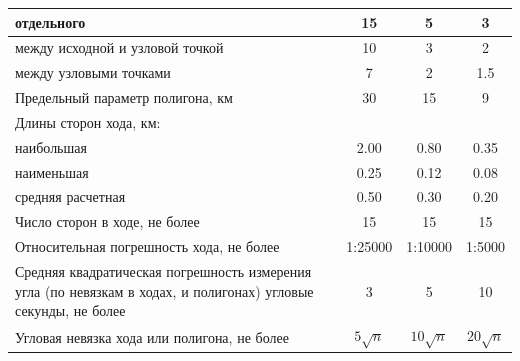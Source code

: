 \documentclass[a4paper]{article}
\begin{document}
\begin{newpage}
{\begin{center}
{\begin{tabular}{|p{280pt}|c|c|c|}
                    \hline
                    отдельного & 15 & 5 & 3\\
                    \hline
                    между исходной и узловой точкой & 10 & 3 & 2\\
                    \hline
                    между узловыми точками & 7 & 2 & 1.5\\
                    \hline
                    Предельный параметр полигона, км & 30 & 15 & 9\\
                    \hline
                    Длины сторон хода, км: &  &  &\\
                    \hline
                    наибольшая & 2.00 & 0.80 & 0.35\\
                    \hline
                    наименьшая & 0.25 & 0.12 & 0.08\\
                    \hline
                    средняя расчетная & 0.50 & 0.30 & 0.20\\
                    \hline
                    Число сторон в ходе, не более & 15 & 15 & 15\\
                    \hline
                    Относительная погрешность хода, не более & 1:25000 & 1:10000 & 1:5000\\
                    \hline
                    Средняя квадратическая погрешность измерения угла (по невязкам в ходах, и полигонах) угловые секунды, не более & 3 & 5 & 10\\
                    \hline
                    Угловая невязка хода или полигона, не более & $5\sqrt{n}$ & $10\sqrt{n}$  & $20\sqrt{n}$\\
                    \hline
                \end{tabular}
            }
        \end{center}
        
}
\end{newpage}
\end{document}
